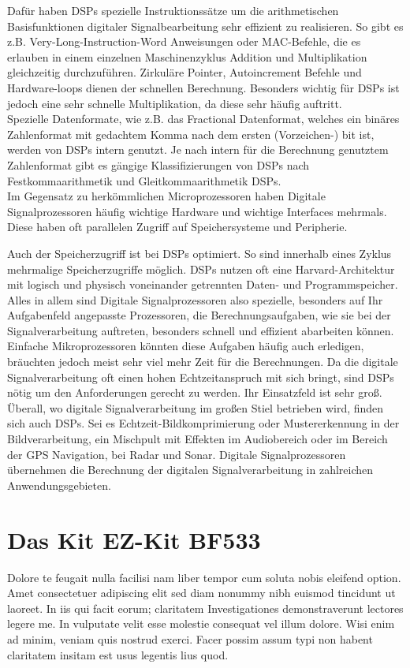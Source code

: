 \documentclass[a4paper,12pt,fontsize=12,DIV=12]{scrartcl}
\begin{document}
Dafür haben DSPs spezielle Instruktionssätze um die arithmetischen Basisfunktionen digitaler Signalbearbeitung sehr effizient zu realisieren. So gibt es z.B. Very-Long-Instruction-Word Anweisungen oder MAC-Befehle, die es erlauben in einem einzelnen Maschinenzyklus Addition und Multiplikation gleichzeitig durchzuführen. Zirkuläre Pointer, Autoincrement Befehle und Hardware-loops dienen der schnellen Berechnung. Besonders wichtig für DSPs ist jedoch eine sehr schnelle Multiplikation, da diese sehr häufig auftritt.
\\

Spezielle Datenformate, wie z.B. das Fractional Datenformat, welches ein binäres Zahlenformat mit gedachtem Komma nach dem ersten (Vorzeichen-) bit ist, werden von DSPs intern genutzt. Je nach intern für die Berechnung genutztem Zahlenformat gibt es gängige Klassifizierungen von DSPs nach Festkommaarithmetik und Gleitkommaarithmetik DSPs.
\\

Im Gegensatz zu herkömmlichen Microprozessoren haben Digitale Signalprozessoren häufig wichtige Hardware und wichtige Interfaces mehrmals. Diese haben oft parallelen Zugriff auf Speichersysteme und Peripherie.

Auch der Speicherzugriff ist bei DSPs optimiert. So sind innerhalb eines Zyklus mehrmalige Speicherzugriffe möglich.
DSPs nutzen oft eine Harvard-Architektur mit logisch und physisch voneinander getrennten Daten- und Programmspeicher. 
\\

Alles in allem sind Digitale Signalprozessoren also spezielle, besonders auf Ihr Aufgabenfeld angepasste Prozessoren, die Berechnungsaufgaben, wie sie bei der Signalverarbeitung auftreten, besonders schnell und effizient abarbeiten können. Einfache Mikroprozessoren könnten diese Aufgaben häufig auch erledigen, bräuchten jedoch meist sehr viel mehr Zeit für die Berechnungen.
Da die digitale Signalverarbeitung oft einen hohen Echtzeitanspruch mit sich bringt, sind DSPs nötig um den Anforderungen gerecht zu werden.
Ihr Einsatzfeld ist sehr groß. Überall, wo digitale Signalverarbeitung im großen Stiel betrieben wird, finden sich auch DSPs. Sei es Echtzeit-Bildkomprimierung oder Mustererkennung in der Bildverarbeitung, ein Mischpult mit Effekten im Audiobereich oder im Bereich der GPS Navigation, bei Radar und Sonar. Digitale Signalprozessoren übernehmen die Berechnung der digitalen Signalverarbeitung in zahlreichen Anwendungsgebieten.

\section{Das Kit EZ-Kit BF533}
Dolore te feugait nulla facilisi nam liber tempor cum soluta nobis eleifend option. Amet consectetuer adipiscing elit sed diam nonummy nibh euismod tincidunt ut laoreet. In iis qui facit eorum; claritatem Investigationes demonstraverunt lectores legere me. In vulputate velit esse molestie consequat vel illum dolore. Wisi enim ad minim, veniam quis nostrud exerci. Facer possim assum typi non habent claritatem insitam est usus legentis lius quod.
\end{document}
